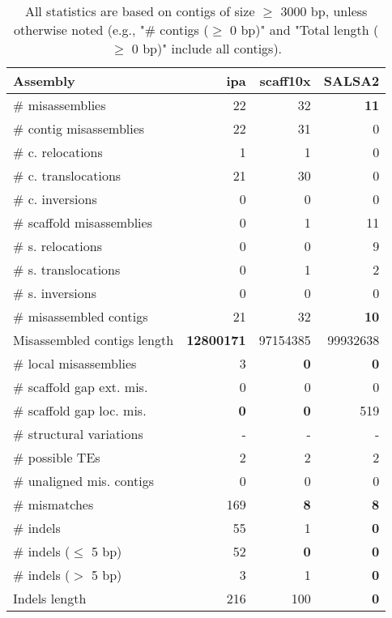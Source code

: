 \documentclass[12pt,a4paper]{article}
\begin{document}
\begin{table}[ht]
\begin{center}
\caption{All statistics are based on contigs of size $\geq$ 3000 bp, unless otherwise noted (e.g., "\# contigs ($\geq$ 0 bp)" and "Total length ($\geq$ 0 bp)" include all contigs).}
\begin{tabular}{|l*{3}{|r}|}
\hline
Assembly & ipa & scaff10x & SALSA2 \\ \hline
\# misassemblies & 22 & 32 & {\bf 11} \\ \hline
\hspace{2mm}\# contig misassemblies & 22 & 31 & 0 \\ \hline
\hspace{5mm}\# c. relocations & 1 & 1 & 0 \\ \hline
\hspace{5mm}\# c. translocations & 21 & 30 & 0 \\ \hline
\hspace{5mm}\# c. inversions & 0 & 0 & 0 \\ \hline
\hspace{2mm}\# scaffold misassemblies & 0 & 1 & 11 \\ \hline
\hspace{5mm}\# s. relocations & 0 & 0 & 9 \\ \hline
\hspace{5mm}\# s. translocations & 0 & 1 & 2 \\ \hline
\hspace{5mm}\# s. inversions & 0 & 0 & 0 \\ \hline
\# misassembled contigs & 21 & 32 & {\bf 10} \\ \hline
Misassembled contigs length & {\bf 12800171} & 97154385 & 99932638 \\ \hline
\# local misassemblies & 3 & {\bf 0} & {\bf 0} \\ \hline
\# scaffold gap ext. mis. & 0 & 0 & 0 \\ \hline
\# scaffold gap loc. mis. & {\bf 0} & {\bf 0} & 519 \\ \hline
\# structural variations & - & - & - \\ \hline
\# possible TEs & 2 & 2 & 2 \\ \hline
\# unaligned mis. contigs & 0 & 0 & 0 \\ \hline
\# mismatches & 169 & {\bf 8} & {\bf 8} \\ \hline
\# indels & 55 & 1 & {\bf 0} \\ \hline
\hspace{5mm}\# indels ($\leq$ 5 bp) & 52 & {\bf 0} & {\bf 0} \\ \hline
\hspace{5mm}\# indels ($>$ 5 bp) & 3 & 1 & {\bf 0} \\ \hline
Indels length & 216 & 100 & {\bf 0} \\ \hline
\end{tabular}
\end{center}
\end{table}
\end{document}
